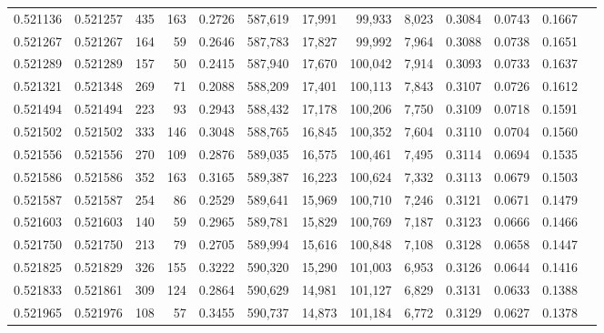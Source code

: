 \begin{tabular}{rrrrrrrrrrrrr}
0.521136 & 0.521257 &   435 &   163 &                                     0.2726 & 587,619 &  17,991 &  99,933 &   8,023 & 0.3084 & 0.0743 & 0.1667 \\
0.521267 & 0.521267 &   164 &    59 &                                     0.2646 & 587,783 &  17,827 &  99,992 &   7,964 & 0.3088 & 0.0738 & 0.1651 \\
0.521289 & 0.521289 &   157 &    50 &                                     0.2415 & 587,940 &  17,670 & 100,042 &   7,914 & 0.3093 & 0.0733 & 0.1637 \\
0.521321 & 0.521348 &   269 &    71 &                                     0.2088 & 588,209 &  17,401 & 100,113 &   7,843 & 0.3107 & 0.0726 & 0.1612 \\
0.521494 & 0.521494 &   223 &    93 &                                     0.2943 & 588,432 &  17,178 & 100,206 &   7,750 & 0.3109 & 0.0718 & 0.1591 \\
0.521502 & 0.521502 &   333 &   146 &                                     0.3048 & 588,765 &  16,845 & 100,352 &   7,604 & 0.3110 & 0.0704 & 0.1560 \\
0.521556 & 0.521556 &   270 &   109 &                                     0.2876 & 589,035 &  16,575 & 100,461 &   7,495 & 0.3114 & 0.0694 & 0.1535 \\
0.521586 & 0.521586 &   352 &   163 &                                     0.3165 & 589,387 &  16,223 & 100,624 &   7,332 & 0.3113 & 0.0679 & 0.1503 \\
0.521587 & 0.521587 &   254 &    86 &                                     0.2529 & 589,641 &  15,969 & 100,710 &   7,246 & 0.3121 & 0.0671 & 0.1479 \\
0.521603 & 0.521603 &   140 &    59 &                                     0.2965 & 589,781 &  15,829 & 100,769 &   7,187 & 0.3123 & 0.0666 & 0.1466 \\
0.521750 & 0.521750 &   213 &    79 &                                     0.2705 & 589,994 &  15,616 & 100,848 &   7,108 & 0.3128 & 0.0658 & 0.1447 \\
0.521825 & 0.521829 &   326 &   155 &                                     0.3222 & 590,320 &  15,290 & 101,003 &   6,953 & 0.3126 & 0.0644 & 0.1416 \\
0.521833 & 0.521861 &   309 &   124 &                                     0.2864 & 590,629 &  14,981 & 101,127 &   6,829 & 0.3131 & 0.0633 & 0.1388 \\
0.521965 & 0.521976 &   108 &    57 &                                     0.3455 & 590,737 &  14,873 & 101,184 &   6,772 & 0.3129 & 0.0627 & 0.1378 \\

\end{tabular}
